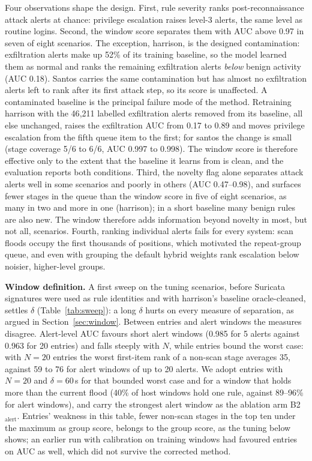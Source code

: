 \documentclass[conference]{IEEEtran}
\begin{document}
Four observations shape the design. First, rule severity ranks post-reconnaissance attack alerts at chance: privilege escalation raises level-3 alerts, the same level as routine logins. Second, the window score separates them with AUC above 0.97 in seven of eight scenarios. The exception, harrison, is the designed contamination: exfiltration alerts make up 52\% of its training baseline, so the model learned them as normal and ranks the remaining exfiltration alerts \emph{below} benign activity (AUC 0.18). Santos carries the same contamination but has almost no exfiltration alerts left to rank after its first attack step, so its score is unaffected. A contaminated baseline is the principal failure mode of the method. Retraining harrison with the 46{,}211 labelled exfiltration alerts removed from its baseline, all else unchanged, raises the exfiltration AUC from 0.17 to 0.89 and moves privilege escalation from the fifth queue item to the first; for santos the change is small (stage coverage 5/6 to 6/6, AUC 0.997 to 0.998). The window score is therefore effective only to the extent that the baseline it learns from is clean, and the evaluation reports both conditions. Third, the novelty flag alone separates attack alerts well in some scenarios and poorly in others (AUC 0.47--0.98), and surfaces fewer stages in the queue than the window score in five of eight scenarios, as many in two and more in one (harrison); in a short baseline many benign rules are also new. The window therefore adds information beyond novelty in most, but not all, scenarios. Fourth, ranking individual alerts fails for every system: scan floods occupy the first thousands of positions, which motivated the repeat-group queue, and even with grouping the default hybrid weights rank escalation below noisier, higher-level groups.


\textbf{Window definition.} A first sweep on the tuning scenarios, before Suricata signatures were used as rule identities and with harrison's baseline oracle-cleaned, settles $\delta$ (Table~\ref{tab:sweep}): a long $\delta$ hurts on every measure of separation, as argued in Section~\ref{sec:window}. Between entries and alert windows the measures disagree. Alert-level AUC favours short alert windows (0.985 for 5 alerts against 0.963 for 20 entries) and falls steeply with $N$, while entries bound the worst case: with $N = 20$ entries the worst first-item rank of a non-scan stage averages 35, against 59 to 76 for alert windows of up to 20 alerts. We adopt entries with $N = 20$ and $\delta = 60$\,s for that bounded worst case and for a window that holds more than the current flood (40\% of host windows hold one rule, against 89--96\% for alert windows), and carry the strongest alert window as the ablation arm B2$_\mathrm{alert}$. Entries' weakness in this table, fewer non-scan stages in the top ten under the maximum as group score, belongs to the group score, as the tuning below shows; an earlier run with calibration on training windows had favoured entries on AUC as well, which did not survive the corrected method.
\end{document}
